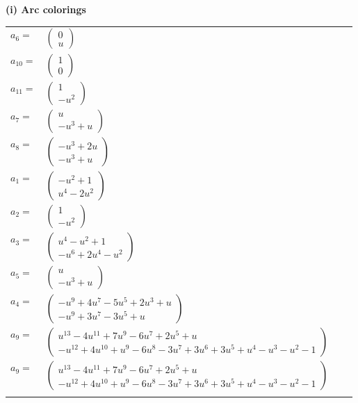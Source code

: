 \documentclass[1p]{elsarticle_modified}
\theoremstyle{definition}
\begin{document}
\flushleft \textbf{(i) Arc colorings}\\
\begin{tabular}{m{7pt} m{180pt} m{7pt} m{180pt} }
\flushright $a_{6}=$&$\begin{pmatrix}0\\u\end{pmatrix}$ \\
\flushright $a_{10}=$&$\begin{pmatrix}1\\0\end{pmatrix}$ \\
\flushright $a_{11}=$&$\begin{pmatrix}1\\- u^2\end{pmatrix}$ \\
\flushright $a_{7}=$&$\begin{pmatrix}u\\- u^3+u\end{pmatrix}$ \\
\flushright $a_{8}=$&$\begin{pmatrix}- u^3+2 u\\- u^3+u\end{pmatrix}$ \\
\flushright $a_{1}=$&$\begin{pmatrix}- u^2+1\\u^4-2 u^2\end{pmatrix}$ \\
\flushright $a_{2}=$&$\begin{pmatrix}1\\- u^2\end{pmatrix}$ \\
\flushright $a_{3}=$&$\begin{pmatrix}u^4- u^2+1\\- u^6+2 u^4- u^2\end{pmatrix}$ \\
\flushright $a_{5}=$&$\begin{pmatrix}u\\- u^3+u\end{pmatrix}$ \\
\flushright $a_{4}=$&$\begin{pmatrix}- u^9+4 u^7-5 u^5+2 u^3+u\\- u^9+3 u^7-3 u^5+u\end{pmatrix}$ \\
\flushright $a_{9}=$&$\begin{pmatrix}u^{13}-4 u^{11}+7 u^9-6 u^7+2 u^5+u\\- u^{12}+4 u^{10}+u^9-6 u^8-3 u^7+3 u^6+3 u^5+u^4- u^3- u^2-1\end{pmatrix}$\\ \flushright $a_{9}=$&$\begin{pmatrix}u^{13}-4 u^{11}+7 u^9-6 u^7+2 u^5+u\\- u^{12}+4 u^{10}+u^9-6 u^8-3 u^7+3 u^6+3 u^5+u^4- u^3- u^2-1\end{pmatrix}$\\&\end{tabular}
\end{document}
